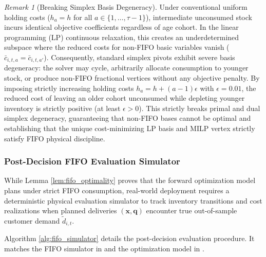 \documentclass[11pt,a4paper]{article}
\theoremstyle{definition}
\theoremstyle{remark}
\newtheorem{remark}{Remark}
\begin{document}
\begin{remark}[Breaking Simplex Basis Degeneracy]
\label{rem:simplex_degeneracy}
Under conventional uniform holding costs ($h_a = h$ for all $a \in \{1, \dots, \tau-1\}$), intermediate unconsumed stock incurs identical objective coefficients regardless of age cohort. In the linear programming (LP) continuous relaxation, this creates an underdetermined subspace where the reduced costs for non-FIFO basic variables vanish ($\bar{c}_{i,t,a} = \bar{c}_{i,t,a'}$). Consequently, standard simplex pivots exhibit severe basis degeneracy: the solver may cycle, arbitrarily allocate consumption to younger stock, or produce non-FIFO fractional vertices without any objective penalty. By imposing strictly increasing holding costs $h_a = h + (a-1)\epsilon$ with $\epsilon = 0.01$, the reduced cost of leaving an older cohort unconsumed while depleting younger inventory is strictly positive (at least $\epsilon > 0$). This strictly breaks primal and dual simplex degeneracy, guaranteeing that non-FIFO bases cannot be optimal and establishing that the unique cost-minimizing LP basis and MILP vertex strictly satisfy FIFO physical discipline.
\end{remark}

\subsubsection{Post-Decision FIFO Evaluation Simulator}
While Lemma \ref{lem:fifo_optimality} proves that the forward optimization model plans under strict FIFO consumption, real-world deployment requires a deterministic physical evaluation simulator to track inventory transitions and cost realizations when planned deliveries $(\mathbf{x}, \mathbf{q})$ encounter true out-of-sample customer demand $\tilde{d}_{i,t}$. 

Algorithm \ref{alg:fifo_simulator} details the post-decision evaluation procedure. It matches the FIFO simulator in  and the optimization model in .
\end{document}
